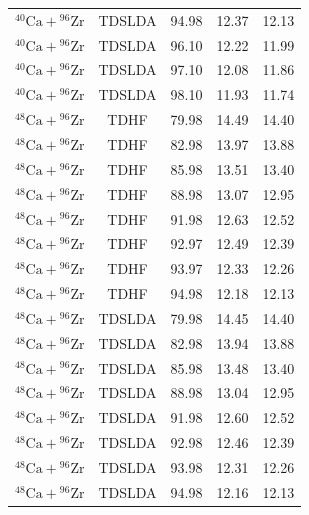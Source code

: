 \documentclass[11pt]{article}
\begin{document}
\begin{table}[htbp]
{\begin{tabular}{c c c c c}
$^{40}\text{Ca} + {}^{96}\text{Zr}$ & TDSLDA & 94.98 & 12.37 & 12.13 \\
$^{40}\text{Ca} + {}^{96}\text{Zr}$ & TDSLDA & 96.10 & 12.22 & 11.99 \\
$^{40}\text{Ca} + {}^{96}\text{Zr}$ & TDSLDA & 97.10 & 12.08 & 11.86 \\
$^{40}\text{Ca} + {}^{96}\text{Zr}$ & TDSLDA & 98.10 & 11.93 & 11.74 \\ \hline
$^{48}\text{Ca} + {}^{96}\text{Zr}$ & TDHF & 79.98 & 14.49 & 14.40 \\
$^{48}\text{Ca} + {}^{96}\text{Zr}$ & TDHF & 82.98 & 13.97 & 13.88 \\
$^{48}\text{Ca} + {}^{96}\text{Zr}$ & TDHF & 85.98 & 13.51 & 13.40 \\
$^{48}\text{Ca} + {}^{96}\text{Zr}$ & TDHF & 88.98 & 13.07 & 12.95 \\
$^{48}\text{Ca} + {}^{96}\text{Zr}$ & TDHF & 91.98 & 12.63 & 12.52 \\
$^{48}\text{Ca} + {}^{96}\text{Zr}$ & TDHF & 92.97 & 12.49 & 12.39 \\
$^{48}\text{Ca} + {}^{96}\text{Zr}$ & TDHF & 93.97 & 12.33 & 12.26 \\
$^{48}\text{Ca} + {}^{96}\text{Zr}$ & TDHF & 94.98 & 12.18 & 12.13 \\ \hline
$^{48}\text{Ca} + {}^{96}\text{Zr}$ & TDSLDA & 79.98 & 14.45 & 14.40 \\
$^{48}\text{Ca} + {}^{96}\text{Zr}$ & TDSLDA & 82.98 & 13.94 & 13.88 \\
$^{48}\text{Ca} + {}^{96}\text{Zr}$ & TDSLDA & 85.98 & 13.48 & 13.40 \\
$^{48}\text{Ca} + {}^{96}\text{Zr}$ & TDSLDA & 88.98 & 13.04 & 12.95 \\
$^{48}\text{Ca} + {}^{96}\text{Zr}$ & TDSLDA & 91.98 & 12.60 & 12.52 \\
$^{48}\text{Ca} + {}^{96}\text{Zr}$ & TDSLDA & 92.98 & 12.46 & 12.39 \\
$^{48}\text{Ca} + {}^{96}\text{Zr}$ & TDSLDA & 93.98 & 12.31 & 12.26 \\
$^{48}\text{Ca} + {}^{96}\text{Zr}$ & TDSLDA & 94.98 & 12.16 & 12.13\\ \hline \hline
\end{tabular}
}
\end{table}
\end{document}
